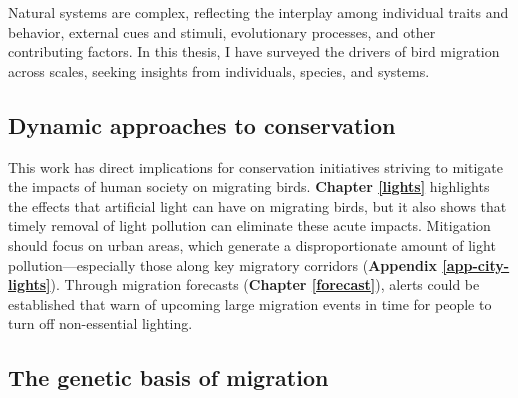 \documentclass[a4paper, nobind]{templates/ociamthesis}
\begin{document}
Natural systems are complex, reflecting the interplay among individual traits and behavior, external cues and stimuli, evolutionary processes, and other contributing factors. In this thesis, I have surveyed the drivers of bird migration across scales, seeking insights from individuals, species, and systems.

\hypertarget{dynamic-approaches-to-conservation}{%
\subsection*{Dynamic approaches to conservation}\label{dynamic-approaches-to-conservation}}

This work has direct implications for conservation initiatives striving to mitigate the impacts of human society on migrating birds. \textbf{Chapter \ref{lights}} highlights the effects that artificial light can have on migrating birds, but it also shows that timely removal of light pollution can eliminate these acute impacts. Mitigation should focus on urban areas, which generate a disproportionate amount of light pollution---especially those along key migratory corridors (\textbf{Appendix \ref{app-city-lights}}). Through migration forecasts (\textbf{Chapter \ref{forecast}}), alerts could be established that warn of upcoming large migration events in time for people to turn off non-essential lighting.

\hypertarget{the-genetic-basis-of-migration}{%
\subsection*{The genetic basis of migration}\label{the-genetic-basis-of-migration}}
\end{document}

